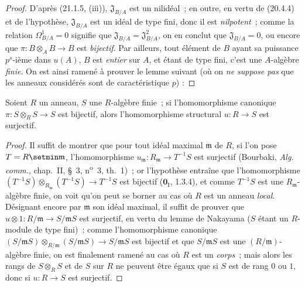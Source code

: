 \begin{proof}
D'après (21.1.5, (iii)), $\mathfrak J_{B/A}$ est un nilidéal~; en outre,
en vertu de (20.4.4) et de l'hypothèse, $\mathfrak J_{B/A}$ est un idéal de
type fini, donc il est \emph{nilpotent}~; comme la relation $\Omega^1_{B/A}=0$
signifie que $\mathfrak J_{B/A}=\mathfrak J_{B/A}^2$, on en conclut que
$\mathfrak J_{B/A}=0$, ou encore que $\pi:B\otimes_A B\to B$ est \emph{bijectif}.
Par ailleurs, tout élément de $B$ ayant sa puissance $p^s$-ième dans $u(A)$,
$B$ est \emph{entier} sur $A$, et étant de type fini, c'est une $A$-algèbre \emph{finie}.
On est ainsi ramené à prouver le lemme suivant (où on \emph{ne suppose pas} que
les anneaux considérés sont de caractéristique $p$) :
\end{proof}

\begin{lemma}[21.1.6.1]
\label{0.21.1.6.1-fr}
Soient $R$ un anneau, $S$ une $R$-algèbre finie~; si l'homomorphisme
canonique $\pi:S\otimes_R S\to S$ est bijectif, alors l'homomorphisme
structural $u:R\to S$ est surjectif.
\end{lemma}

\begin{proof}
Il suffit de montrer que pour tout idéal maximal $\mathfrak m$ de $R$, si
l'on pose $T=R\setmin\mathfrak m$, l'homomorphisme
$u_{\mathfrak m}:R_{\mathfrak m}\to T^{-1}S$ est surjectif (Bourbaki,
\emph{Alg. comm.}, chap.~II, §~3, n\textsuperscript{o}~3, th.~1)~; or l'hypothèse
entraîne que l'homomorphisme
$(T^{-1}S)\otimes_{R_{\mathfrak m}}(T^{-1}S)\to T^{-1}S$
est bijectif ($\mathbf{0}_{\mathrm I}$, 1.3.4), et comme $T^{-1}S$ est une
$R_{\mathfrak m}$-algèbre finie, on voit qu'on peut se borner au cas où
$R$ est un anneau \emph{local}.
Désignant encore par $\mathfrak m$ son idéal maximal, il suffit de prouver que
$u\otimes1:R/\mathfrak m\to S/\mathfrak mS$ est surjectif, en vertu du
lemme de Nakayama ($S$ étant un $R$-module de type fini)~; comme
l'homomorphisme canonique
$(S/\mathfrak mS)\otimes_{R/\mathfrak m}(S/\mathfrak mS)\to S/\mathfrak mS$
est bijectif et que $S/\mathfrak mS$ est une $(R/\mathfrak m)$-algèbre finie,
on est finalement ramené au cas où $R$ est un \emph{corps}~; mais alors les rangs de
$S\otimes_R S$ et de $S$ sur $R$ ne peuvent être égaux que si $S$ est de rang
$0$ ou $1$, donc si $u:R\to S$ est surjectif.
\end{proof}

